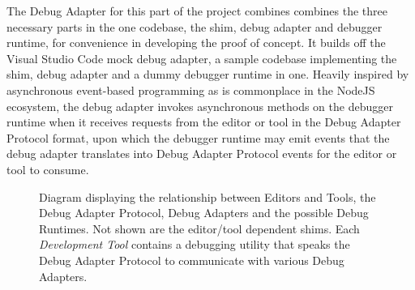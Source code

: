 \documentclass[12pt,pdftex,titlepage]{report}
\begin{document}
                    The Debug Adapter for this part of the project combines combines the three necessary parts in the one codebase, the shim, debug adapter and debugger runtime, for convenience
                    in developing the proof of concept. It builds off the Visual Studio Code mock debug adapter, a sample codebase implementing the shim, debug adapter and a dummy debugger
                    runtime in one. Heavily inspired by asynchronous event-based programming as is commonplace in the NodeJS ecosystem, the debug adapter invokes asynchronous methods on the 
                    debugger runtime when it receives requests from the editor or tool in the Debug Adapter Protocol format, upon which the debugger runtime may emit events that the debug adapter
                    translates into Debug Adapter Protocol events for the editor or tool to consume.

                    \begin{figure}[hbt!]
                        \centering
                        \caption{Diagram displaying the relationship between Editors and Tools, the Debug Adapter Protocol, Debug Adapters and the possible Debug Runtimes. Not shown are the
                            editor/tool dependent shims. Each \textit{Development Tool} contains a debugging utility that speaks the Debug Adapter Protocol to communicate with various Debug
                            Adapters.}
                        \label{fig:debug-arch}
                    \end{figure}
\end{document}
